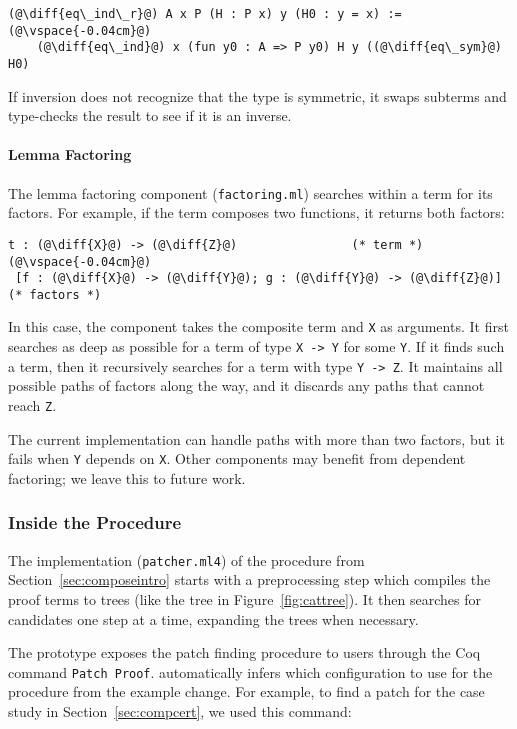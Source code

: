 \begin{lstlisting}[language=coq]
  (@\diff{eq\_ind\_r}@) A x P (H : P x) y (H0 : y = x) :=(@\vspace{-0.04cm}@)
    (@\diff{eq\_ind}@) x (fun y0 : A => P y0) H y ((@\diff{eq\_sym}@) H0)	
\end{lstlisting}
If inversion does not recognize that the type is symmetric, it
swaps subterms and type-checks the result to see if it is an inverse.

\paragraph{Lemma Factoring} The lemma factoring component (\lstinline{factoring.ml}) searches within a term
for its factors. For example,
if the term composes two functions, it returns both factors:

\begin{lstlisting}[language=coq]
  t : (@\diff{X}@) -> (@\diff{Z}@)                (* term *)(@\vspace{-0.04cm}@)
 [f : (@\diff{X}@) -> (@\diff{Y}@); g : (@\diff{Y}@) -> (@\diff{Z}@)] (* factors *)
\end{lstlisting}
In this case, the component takes the composite term and \lstinline{X} as arguments.
It first searches as deep as possible for a term of type \lstinline{X -> Y} for some \lstinline{Y}.
If it finds such a term, then it recursively searches for a term with type \lstinline{Y -> Z}. 
It maintains all possible 
paths of factors along the way, and it discards any paths that cannot reach \lstinline{Z}.

The current implementation can handle paths
with more than two factors, but it fails when \lstinline{Y} depends on \lstinline{X}.
Other components may benefit from dependent factoring; we leave this to future work.

\subsubsection{Inside the Procedure}
\label{sec:algimpl}

The implementation (\lstinline{patcher.ml4}) of the procedure from Section~\ref{sec:composeintro} starts with a
preprocessing step which compiles the proof terms to trees (like the tree in Figure~\ref{fig:cattree}).
It then searches for candidates one step at a time, expanding the trees when necessary.

The \sysname prototype exposes the patch finding procedure to users through the Coq 
command \lstinline{Patch Proof}. \sysname automatically
infers which configuration to use for the procedure from the example change. For example, to
find a patch for the case study in Section~\ref{sec:compcert}, we
used this command:

